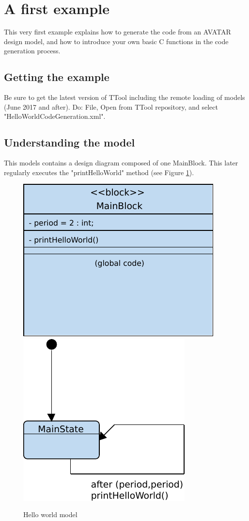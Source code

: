 \documentclass[12pt]{article}
\begin{document}
\newpage
\section{A first example}\label{sec:example}
This very first example explains how to generate the code from an AVATAR design model, and how to introduce your own basic C functions in the code generation process.

\subsection{Getting the example}
Be sure to get the latest version of TTool including the remote loading of models (June 2017 and after). Do: File, Open from TTool repository, and select "HelloWorldCodeGeneration.xml".

\subsection{Understanding the model}
This models contains a design diagram composed of one MainBlock. This later regularly executes the "printHelloWorld" method (see Figure \ref{fig:printhelloworld}).


\begin{figure}[htbp]
\centering
\includegraphics[scale=0.65]{figures/bdhelloworld.pdf}
\hspace{1cm}
\includegraphics[scale=0.65]{figures/smdhelloworld.pdf}
\caption{Hello world model} \label{fig:printhelloworld}
\end{figure}
\end{document}

